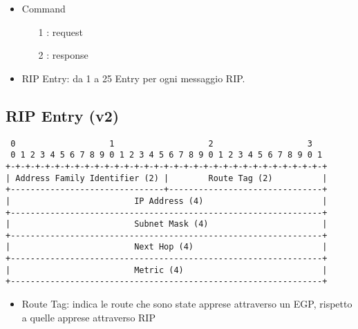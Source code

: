 \documentclass{article}
\begin{document}
\begin{itemize}
    \item Command
    \begin{itemize}
        \item[1]: request
        \item[2]: response
    \end{itemize}
    \item RIP Entry: da 1 a 25 Entry per ogni messaggio RIP.
\end{itemize}
\subsection{RIP Entry (v2)}
\begin{verbatim}
 0                   1                   2                   3
 0 1 2 3 4 5 6 7 8 9 0 1 2 3 4 5 6 7 8 9 0 1 2 3 4 5 6 7 8 9 0 1
+-+-+-+-+-+-+-+-+-+-+-+-+-+-+-+-+-+-+-+-+-+-+-+-+-+-+-+-+-+-+-+-+
| Address Family Identifier (2) |        Route Tag (2)          |
+-------------------------------+-------------------------------+
|                         IP Address (4)                        |
+---------------------------------------------------------------+
|                         Subnet Mask (4)                       |
+---------------------------------------------------------------+
|                         Next Hop (4)                          |
+---------------------------------------------------------------+
|                         Metric (4)                            |
+---------------------------------------------------------------+
\end{verbatim}
\begin{itemize}
    \item Route Tag: indica le route che sono state apprese attraverso un EGP, rispetto a quelle apprese attraverso RIP
\end{itemize}
\end{document}
